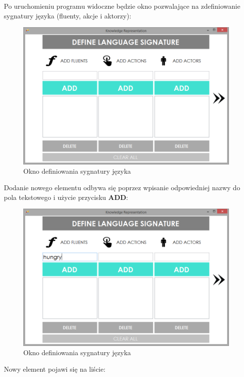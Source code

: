 \documentclass{article}
\begin{document}
\newpage
Po uruchomieniu programu widoczne będzie okno pozwalające na zdefiniowanie sygnatury języka (fluenty, akcje i aktorzy):

\begin{figure}[H]
\centering
\includegraphics[scale=0.4]{01}
\caption{Okno definiowania sygnatury języka}
\end{figure}


Dodanie nowego elementu odbywa się poprzez wpisanie odpowiedniej nazwy do pola tekstowego i użycie przycisku \textbf{ADD}:

\begin{figure}[H]
\centering
\includegraphics[scale=0.4]{02}
\caption{Okno definiowania sygnatury języka}
\end{figure}
\newpage

Nowy element pojawi się na liście:
\end{document}
